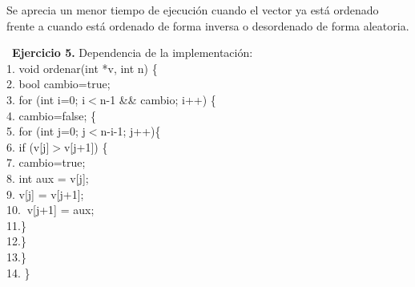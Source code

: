 \documentclass[titlepage, 12pt,a4paper]{article}
\begin{document}
Se aprecia un menor tiempo de ejecución cuando el vector ya está ordenado frente a cuando está ordenado de forma inversa o desordenado de forma aleatoria.
\newpage

\ 
  \textbf{\large Ejercicio 5.} Dependencia de la implementación:\\ 
  
  \hspace*{1cm}1. void ordenar(int *v, int n) \{ \\
  \hspace*{1cm}2.\hspace*{2em}  bool cambio=true;\\
  \hspace*{1cm}3.\hspace*{2em} 	for (int i=0; i$<$n-1 \&\& cambio; i++) \{ \\
  \hspace*{1cm}4.\hspace*{4em}      cambio=false; \{\\
  \hspace*{1cm}5.\hspace*{4em}      for (int j=0; j$<$n-i-1; j++)\{ \\
  \hspace*{1cm}6.\hspace*{6em}        if (v[j]$>$v[j+1]) \{\\
  \hspace*{1cm}7.\hspace*{8em}        cambio=true;\\
  \hspace*{1cm}8.\hspace*{8em}		  int aux = v[j]; \\
  \hspace*{1cm}9.\hspace*{8em}		  v[j] = v[j+1]; \\
  \hspace*{1cm}10.\hspace*{7em}		  $\ $v[j+1] = aux; \\
  \hspace*{1cm}11.\hspace*{6em}\} \\
  \hspace*{1cm}12.\hspace*{4em}\} \\
  \hspace*{1cm}13.\hspace*{2em}\} \\
  \hspace*{1cm}14. \}  \vspace {1em} \\
\end{document}

